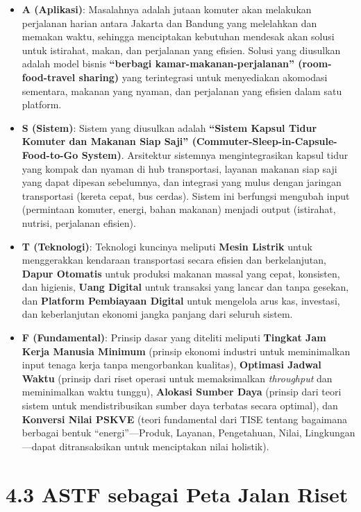 \documentclass[
  letterpaper,
  DIV=11,
  numbers=noendperiod]{scrreprt}
\providecommand{\tightlist}{%
  \setlength{\itemsep}{0pt}\setlength{\parskip}{0pt}}
\begin{document}
\begin{itemize}
\tightlist
\item
  \textbf{A (Aplikasi)}: Masalahnya adalah jutaan komuter akan melakukan
  perjalanan harian antara Jakarta dan Bandung yang melelahkan dan
  memakan waktu, sehingga menciptakan kebutuhan mendesak akan solusi
  untuk istirahat, makan, dan perjalanan yang efisien. Solusi yang
  diusulkan adalah model bisnis \textbf{``berbagi
  kamar-makanan-perjalanan'' (room-food-travel sharing)} yang
  terintegrasi untuk menyediakan akomodasi sementara, makanan yang
  nyaman, dan perjalanan yang efisien dalam satu platform.
\item
  \textbf{S (Sistem)}: Sistem yang diusulkan adalah \textbf{``Sistem
  Kapsul Tidur Komuter dan Makanan Siap Saji''
  (Commuter-Sleep-in-Capsule-Food-to-Go System)}. Arsitektur sistemnya
  mengintegrasikan kapsul tidur yang kompak dan nyaman di hub
  transportasi, layanan makanan siap saji yang dapat dipesan sebelumnya,
  dan integrasi yang mulus dengan jaringan transportasi (kereta cepat,
  bus cerdas). Sistem ini berfungsi mengubah input (permintaan komuter,
  energi, bahan makanan) menjadi output (istirahat, nutrisi, perjalanan
  efisien).
\item
  \textbf{T (Teknologi)}: Teknologi kuncinya meliputi \textbf{Mesin
  Listrik} untuk menggerakkan kendaraan transportasi secara efisien dan
  berkelanjutan, \textbf{Dapur Otomatis} untuk produksi makanan massal
  yang cepat, konsisten, dan higienis, \textbf{Uang Digital} untuk
  transaksi yang lancar dan tanpa gesekan, dan \textbf{Platform
  Pembiayaan Digital} untuk mengelola arus kas, investasi, dan
  keberlanjutan ekonomi jangka panjang dari seluruh sistem.
\item
  \textbf{F (Fundamental)}: Prinsip dasar yang diteliti meliputi
  \textbf{Tingkat Jam Kerja Manusia Minimum} (prinsip ekonomi industri
  untuk meminimalkan input tenaga kerja tanpa mengorbankan kualitas),
  \textbf{Optimasi Jadwal Waktu} (prinsip dari riset operasi untuk
  memaksimalkan \emph{throughput} dan meminimalkan waktu tunggu),
  \textbf{Alokasi Sumber Daya} (prinsip dari teori sistem untuk
  mendistribusikan sumber daya terbatas secara optimal), dan
  \textbf{Konversi Nilai PSKVE} (teori fundamental dari TISE tentang
  bagaimana berbagai bentuk ``energi''---Produk, Layanan, Pengetahuan,
  Nilai, Lingkungan---dapat ditransaksikan untuk menciptakan nilai
  holistik).
\end{itemize}

\section{\texorpdfstring{\textbf{4.3 ASTF sebagai Peta Jalan
Riset}}{4.3 ASTF sebagai Peta Jalan Riset}}\label{astf-sebagai-peta-jalan-riset}
\end{document}
